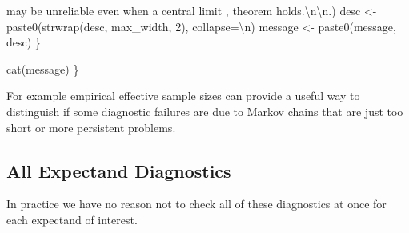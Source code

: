 \documentclass[
  letterpaper,
  DIV=11,
  numbers=noendperiod]{scrartcl}
\newenvironment{Shaded}{\begin{snugshade}}{\end{snugshade}}
\newcommand{\AttributeTok}[1]{\textcolor[rgb]{0.40,0.45,0.13}{#1}}
\newcommand{\DecValTok}[1]{\textcolor[rgb]{0.68,0.00,0.00}{#1}}
\newcommand{\FunctionTok}[1]{\textcolor[rgb]{0.28,0.35,0.67}{#1}}
\newcommand{\NormalTok}[1]{\textcolor[rgb]{0.00,0.23,0.31}{#1}}
\newcommand{\OtherTok}[1]{\textcolor[rgb]{0.00,0.23,0.31}{#1}}
\newcommand{\SpecialCharTok}[1]{\textcolor[rgb]{0.37,0.37,0.37}{#1}}
\newcommand{\StringTok}[1]{\textcolor[rgb]{0.13,0.47,0.30}{#1}}
\begin{document}
\begin{Shaded}
\begin{Highlighting}[]
                   \StringTok{\textquotesingle{}may be unreliable even when a central limit \textquotesingle{}}\NormalTok{,}
                   \StringTok{\textquotesingle{}theorem holds.}\SpecialCharTok{\textbackslash{}n\textbackslash{}n}\StringTok{.\textquotesingle{}}\NormalTok{)}
\NormalTok{    desc }\OtherTok{\textless{}{-}} \FunctionTok{paste0}\NormalTok{(}\FunctionTok{strwrap}\NormalTok{(desc, max\_width, }\DecValTok{2}\NormalTok{), }\AttributeTok{collapse=}\StringTok{\textquotesingle{}}\SpecialCharTok{\textbackslash{}n}\StringTok{\textquotesingle{}}\NormalTok{)}
\NormalTok{    message }\OtherTok{\textless{}{-}} \FunctionTok{paste0}\NormalTok{(message, desc)}
\NormalTok{  \}}
  
  \FunctionTok{cat}\NormalTok{(message)}
\NormalTok{\}}
\end{Highlighting}
\end{Shaded}

For example empirical effective sample sizes can provide a useful way to
distinguish if some diagnostic failures are due to Markov chains that
are just too short or more persistent problems.

\hypertarget{all-expectand-diagnostics}{%
\subsection{All Expectand Diagnostics}\label{all-expectand-diagnostics}}

In practice we have no reason not to check all of these diagnostics at
once for each expectand of interest.
\end{document}
